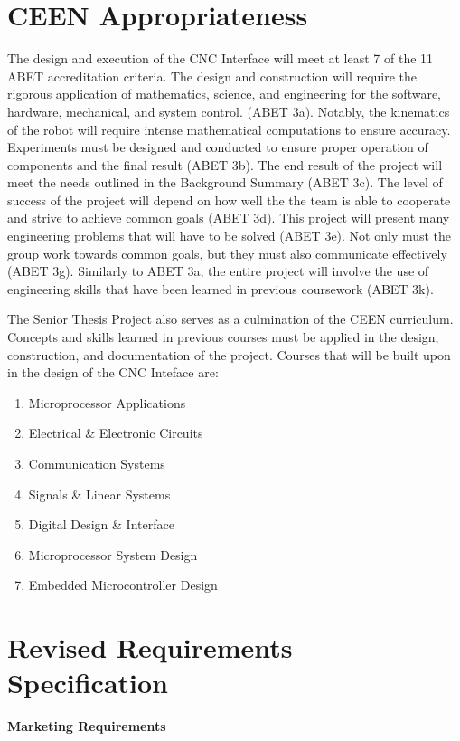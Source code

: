 \section{CEEN Appropriateness}
The design and execution of the CNC Interface will meet at least 7 of the 11 ABET accreditation criteria.
The design and construction will require the rigorous application of mathematics, science, and engineering for the software, hardware, mechanical, and system control. (ABET 3a).
Notably, the kinematics of the robot will require intense mathematical computations to ensure accuracy.
Experiments must be designed and conducted to ensure proper operation of components and the final result (ABET 3b).
The end result of the project will meet the needs outlined in the Background Summary (ABET 3c).
The level of success of the project will depend on how well the the team is able to cooperate and strive to achieve common goals (ABET 3d).
This project will present many engineering problems that will have to be solved (ABET 3e).
Not only must the group work towards common goals, but they must also communicate effectively (ABET 3g).
Similarly to ABET 3a, the entire project will involve the use of engineering skills that have been learned in previous coursework (ABET 3k).

The Senior Thesis Project also serves as a culmination of the CEEN curriculum. Concepts and skills learned in previous courses must be applied in the design, construction, and documentation of the project.
Courses that will be built upon in the design of the CNC Inteface are:
\begin{enumerate} \parskip2pt
	\item Microprocessor Applications
	\item Electrical \& Electronic Circuits
	\item Communication Systems
	\item Signals \& Linear Systems
	\item Digital Design \& Interface
	\item Microprocessor System Design
	\item Embedded Microcontroller Design
\end{enumerate}

\section{Revised Requirements Specification}
\textbf{Marketing Requirements}

